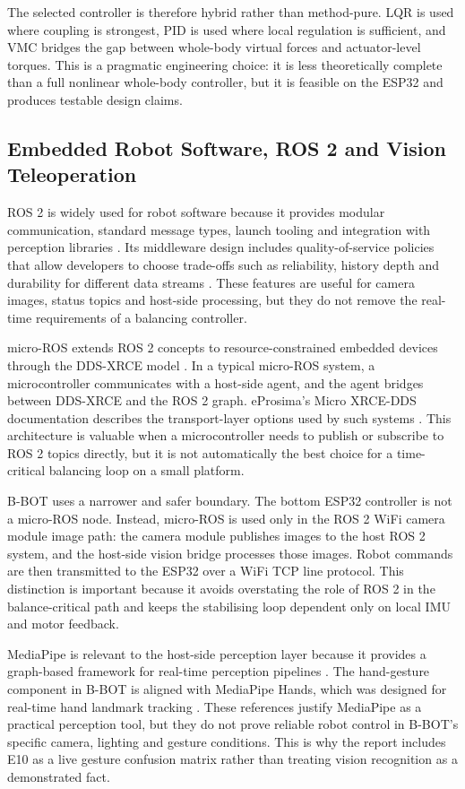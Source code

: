\documentclass[12pt, a4paper]{article}
\begin{document}
The selected controller is therefore hybrid rather than method-pure. LQR is used where coupling is strongest, PID is used where local regulation is sufficient, and VMC bridges the gap between whole-body virtual forces and actuator-level torques. This is a pragmatic engineering choice: it is less theoretically complete than a full nonlinear whole-body controller, but it is feasible on the ESP32 and produces testable design claims.

\subsection{Embedded Robot Software, ROS 2 and Vision Teleoperation}

ROS 2 is widely used for robot software because it provides modular communication, standard message types, launch tooling and integration with perception libraries \cite{macenski2022ros2}. Its middleware design includes quality-of-service policies that allow developers to choose trade-offs such as reliability, history depth and durability for different data streams \cite{ros2_qos_design}. These features are useful for camera images, status topics and host-side processing, but they do not remove the real-time requirements of a balancing controller.

micro-ROS extends ROS 2 concepts to resource-constrained embedded devices through the DDS-XRCE model \cite{omg_ddsxrce,microros_docs}. In a typical micro-ROS system, a microcontroller communicates with a host-side agent, and the agent bridges between DDS-XRCE and the ROS 2 graph. eProsima's Micro XRCE-DDS documentation describes the transport-layer options used by such systems \cite{eprosima_microxrcedds}. This architecture is valuable when a microcontroller needs to publish or subscribe to ROS 2 topics directly, but it is not automatically the best choice for a time-critical balancing loop on a small platform.

B-BOT uses a narrower and safer boundary. The bottom ESP32 controller is not a micro-ROS node. Instead, micro-ROS is used only in the ROS 2 WiFi camera module image path: the camera module publishes images to the host ROS 2 system, and the host-side vision bridge processes those images. Robot commands are then transmitted to the ESP32 over a WiFi TCP line protocol. This distinction is important because it avoids overstating the role of ROS 2 in the balance-critical path and keeps the stabilising loop dependent only on local IMU and motor feedback.

MediaPipe is relevant to the host-side perception layer because it provides a graph-based framework for real-time perception pipelines \cite{lugaresi2019mediapipe}. The hand-gesture component in B-BOT is aligned with MediaPipe Hands, which was designed for real-time hand landmark tracking \cite{zhang2020mediapipehands}. These references justify MediaPipe as a practical perception tool, but they do not prove reliable robot control in B-BOT's specific camera, lighting and gesture conditions. This is why the report includes E10 as a live gesture confusion matrix rather than treating vision recognition as a demonstrated fact.
\end{document}
